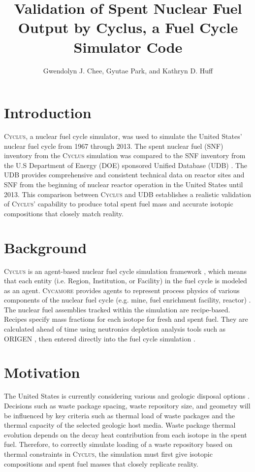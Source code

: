 \documentclass{anstrans}
\title{Validation of Spent Nuclear Fuel Output by Cyclus, a Fuel Cycle Simulator Code}
\author{Gwendolyn J. Chee, Gyutae Park, and Kathryn D. Huff}
\institute{
Dept. of Nuclear, Plasma and Radiological Engineering, University of Illinois at Urbana-Champaign \\
gchee2@illinois.edu
}
\newcommand{\Cyclus}{\textsc{Cyclus}\xspace}%
\newcommand{\Cycamore}{\textsc{Cycamore}\xspace}%
\begin{document}
\section{Introduction}
\Cyclus \cite{carlsen_cyclus_2014}, a nuclear fuel cycle simulator, was used to simulate the
United States' nuclear fuel cycle from 1967 through 2013. The spent nuclear 
fuel (SNF) inventory from the \Cyclus simulation was compared to the SNF 
inventory from the U.S Department of Energy (DOE) sponsored Unified Database 
(UDB) \cite{peterson_unf-st&dards_2017}. The UDB provides comprehensive and 
consistent technical data on reactor sites and SNF from the beginning of 
nuclear reactor operation in the United States until 2013. This comparison 
between \Cyclus and UDB establishes a realistic validation of \Cyclus' 
capability to produce total spent fuel mass and accurate isotopic compositions 
that closely match reality.

\section{Background}
\Cyclus is an agent-based nuclear fuel cycle simulation framework 
\cite{huff_fundamental_2016}, which means that each entity (i.e. Region, 
Institution, or Facility) in the fuel cycle is modeled as an agent. 
\Cycamore \cite{carlsen_cycamore_2014} provides agents to represent process 
physics of various components of the nuclear fuel cycle (e.g. mine, fuel 
enrichment facility, reactor) \cite{huff_extensions_2014}. The nuclear fuel 
assemblies tracked within the simulation are recipe-based. Recipes specify mass 
fractions for each isotope for fresh and spent fuel. They are calculated ahead 
of time using neutronics depletion analysis tools such as ORIGEN 
\cite{bell_origen_1973}, then entered directly into the fuel cycle simulation 
\cite{peterson_additional_2017}. 

\section{Motivation}
The United States is currently considering various and geologic disposal 
options \cite{DOE_strategy_2013}. Decisions such as waste package spacing, 
waste repository size, and geometry will be influenced by key criteria such as 
thermal load of waste packages and the thermal capacity of the selected 
geologic host media. Waste package thermal evolution depends on the decay heat 
contribution from each isotope in the spent fuel. Therefore, to correctly 
simulate loading of a waste repository based on thermal constraints in \Cyclus, 
the simulation must first give isotopic compositions and spent fuel masses that 
closely replicate reality. 
\end{document}
